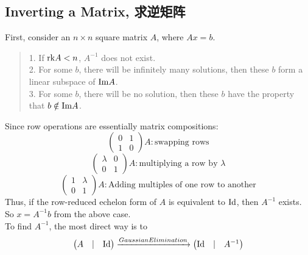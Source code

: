 \subsection{Inverting a Matrix, 求逆矩阵}
First, consider an $n \times n$ square matrix $A$, where $Ax = b$.
\begin{quote}
    1. If $\text{rk} A < n$, $A^{-1}$ does not exist. \\
    2. For some $b$, there will be infinitely many solutions, then these $b$ form a linear subspace of $\text{Im} A$. \\
    3. For some $b$, there will be no solution, then these $b$ have the property that $b \notin \text{Im} A$.
\end{quote}
Since row operations are essentially matrix compositions:
$$\begin{pmatrix}
    0 & 1 \\
    1 & 0
\end{pmatrix}A: \text{swapping rows}$$
$$\begin{pmatrix}
    \lambda & 0 \\
    0 & 1
\end{pmatrix}A: \text{multiplying a row by $\lambda$}$$
$$\begin{pmatrix}
    1 & \lambda \\
    0 & 1
\end{pmatrix}A: \text{Adding multiples of one row to another}$$
Thus, if the row-reduced echelon form of $A$ is equivalent to $\text{Id}$, then $A^{-1}$ exists. So $x = A^{-1}b$ from the above case. \\
To find $A^{-1}$, the most direct way is to
$$\begin{pmatrix}
    A & | & \text{Id}
\end{pmatrix} \xrightarrow{Gaussian Elimination} \begin{pmatrix}
    \text{Id} & | & A^{-1}
\end{pmatrix}$$
\newpage